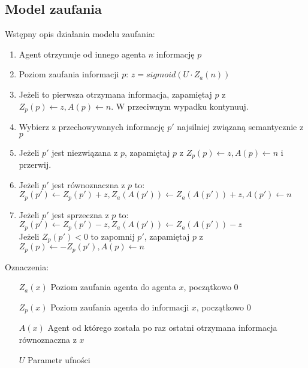 \documentclass{article}
\begin{document}
	\subsection{Model zaufania}
	Wstępny opis działania modelu zaufania:
	\begin{enumerate}
		\item Agent otrzymuje od innego agenta $n$ informację $p$
		\item Poziom zaufania informacji $p$: $ z = sigmoid(U \cdot Z_a(n)) $
		\item Jeżeli to pierwsza otrzymana informacja,
		zapamiętaj $p$ z $ Z_p(p) \leftarrow z, A(p) \leftarrow n $.
		W przeciwnym wypadku kontynuuj.
		\item Wybierz z przechowywanych informację $p'$ najsilniej związaną semantycznie z $p$
		\item Jeżeli $p'$ jest niezwiązana z $p$, zapamiętaj $p$ z $ Z_p(p) \leftarrow z, A(p) \leftarrow n $ i przerwij.
		\item Jeżeli $p'$ jest równoznaczna z $p$ to:\\
		$ Z_p(p') \leftarrow Z_p(p') + z, Z_a(A(p')) \leftarrow Z_a(A(p')) + z , A(p') \leftarrow n $
		\item Jeżeli $p'$ jest sprzeczna z $p$ to:\\
		$ Z_p(p') \leftarrow Z_p(p') - z, Z_a(A(p')) \leftarrow Z_a(A(p')) - z$\\
		Jeżeli $ Z_p(p') < 0 $ to zapomnij $p'$, zapamiętaj $p$ z\\
		$ Z_p(p) \leftarrow -Z_p(p'), A(p) \leftarrow n $
	\end{enumerate}
	Oznaczenia:
	\begin{itemize}
		\item[$Z_a(x)$] Poziom zaufania agenta do agenta $x$, początkowo $0$
		\item[$Z_p(x)$] Poziom zaufania agenta do informacji $x$, początkowo $0$
		\item[$A(x)$] Agent od którego została po raz ostatni otrzymana informacja równoznaczna z $x$
		
		\item[$U$] Parametr ufności
		
	\end{itemize}
\end{document}
